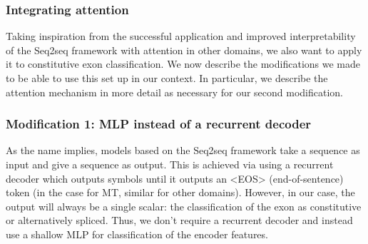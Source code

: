 \subsubsection{Integrating attention}
Taking inspiration from the successful application and improved interpretability of the Seq2seq framework with attention in other domains, we also want to apply it to constitutive exon classification. We now describe the modifications we made to be able to use this set up in our context. In particular, we describe the attention mechanism in more detail as necessary for our second modification.
\subsubsection{Modification 1: MLP instead of a recurrent decoder}
As the name implies, models based on the Seq2seq framework take a sequence as input and give a sequence as output. This is achieved via using a recurrent decoder which outputs symbols until it outputs an <EOS> (end-of-sentence) token (in the case for MT, similar for other domains). However, in our case, the output will always be a single scalar: the classification of the exon as constitutive or alternatively spliced. Thus, we don't require a recurrent decoder and instead use a shallow MLP for classification of the encoder features.
